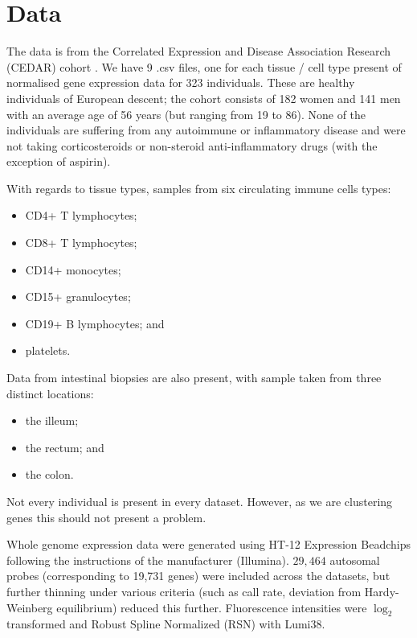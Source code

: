 \documentclass[11pt]{article} %
\begin{document}
	

	

	\section{Data}	
	The data is from the Correlated Expression and Disease Association Research (CEDAR) cohort \cite{the_international_ibd_genetics_consortium_ibd_2018}. We have 9 .csv files, one for each tissue / cell type present of normalised gene expression data for 323 individuals. These are healthy individuals of European descent; the cohort consists of 182 women and 141 men with an average age of 56 years (but ranging from 19 to 86). None of the individuals are suffering from any autoimmune or inflammatory disease and were not taking corticosteroids or non-steroid anti-inflammatory drugs (with the exception of aspirin). 
	
	With regards to tissue types, samples from six circulating immune cells types:
	\begin{itemize}
		\item CD4+ T lymphocytes;
		\item CD8+ T lymphocytes;
		\item CD14+ monocytes;
		\item CD15+ granulocytes;
		\item CD19+ B lymphocytes; and 
		\item platelets.
	\end{itemize}
	Data from intestinal biopsies are also present, with sample taken from three distinct locations:
	\begin{itemize}
		\item the illeum;
		\item the rectum; and
		\item the colon.
	\end{itemize} 
	Not every individual is present in every dataset. However, as we are clustering genes this should not present a problem.
	
	Whole genome expression data were generated using HT-12 Expression Beadchips following the instructions of the manufacturer (Illumina). $29,464$ autosomal probes (corresponding to 19,731 genes) were included across the datasets, but further thinning under various criteria (such as call rate, deviation from Hardy-Weinberg equilibrium) reduced this further. Fluorescence intensities were $\log_2$ transformed and Robust Spline Normalized (RSN) with Lumi38.
	
\end{document}
